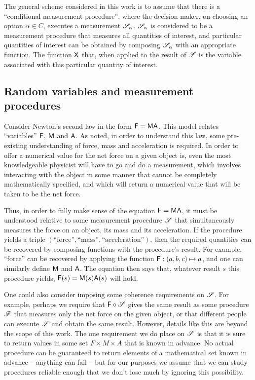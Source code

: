 The general scheme considered in this work is to assume that there is a  ``conditional measurement procedure'', where the decision maker, on choosing an option $\alpha\in C$, executes a measurement $\mathscr{S}_\alpha$. $\mathscr{S}_\alpha$ is considered to be a measurement procedure that measures all quantities of interest, and particular quantities of interest can be obtained by composing $\mathscr{S}_\alpha$ with an appropriate function. The function $\mathsf{X}$ that, when applied to the result of $\mathscr{S}$ is the variable associated with this particular quantity of interest.

\subsection{Random variables and measurement procedures}\label{sec:rvs_mps}

Consider Newton's second law in the form $\mathsf{F}=\mathsf{MA}$. This model relates ``variables'' $\mathsf{F}$, $\mathsf{M}$ and $\mathsf{A}$. As \citet{feynman_feynman_1979} noted, in order to understand this law, some pre-existing understanding of force, mass and acceleration is required. In order to offer a numerical value for the net force on a given object is, even the most knowledgeable physicist will have to go and do a measurement, which involves interacting with the object in some manner that cannot be completely mathematically specified, and which will return a numerical value that will be taken to be the net force.

Thus, in order to fully make sense of the equation $\mathsf{F}=\mathsf{MA}$, it must be understood relative to some measurement procedure $\mathscr{S}$ that simultaneously measures the force on an object, its mass and its acceleration. If the procedure yields a triple $(\text{``force''},\text{``mass''},\text{``acceleration''})$, then the required quantities can be recovered by composing functions with the procedure's result. For example, ``force'' can be recovered by applying the function $\mathsf{F}:(a,b,c)\mapsto a$, and one can similarly define $\mathsf{M}$ and $\mathsf{A}$. The equation then says that, whatever result $s$ this procedure yields, $\mathsf{F}(s)=\mathsf{M}(s)\mathsf{A}(s)$ will hold.

One could also consider imposing some coherence requirements on $\mathscr{S}$. For example, perhaps we require that $\mathsf{F}\circ\mathscr{S}$ gives the same result as some procedure $\mathscr{F}$ that measures only the net force on the given object, or that different people can execute $\mathscr{S}$ and obtain the same result. However, details like this are beyond the scope of this work. The one requirement we do place on $\mathscr{S}$ is that it is sure to return values in some set $F\times M\times A$ that is known in advance. No actual procedure can be guaranteed to return elements of a mathematical set known in advance -- anything can fail -- but for our purposes we assume that we can study procedures reliable enough that we don't lose much by ignoring this possibility.


